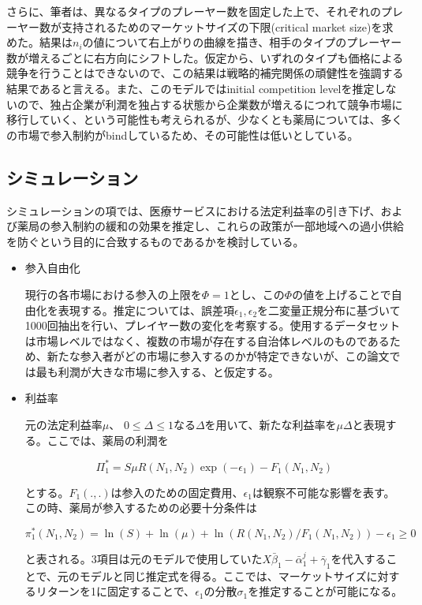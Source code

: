 \documentclass[11pt]{jsarticle}
\begin{document}
さらに、筆者は、異なるタイプのプレーヤー数を固定した上で、それぞれのプレーヤー数が支持されるためのマーケットサイズの下限(critical market size)を求めた。結果は$n_i$の値について右上がりの曲線を描き、相手のタイプのプレーヤー数が増えるごとに右方向にシフトした。仮定から、いずれのタイプも価格による競争を行うことはできないので、この結果は戦略的補完関係の頑健性を強調する結果であると言える。また、このモデルではinitial competition levelを推定しないので、独占企業が利潤を独占する状態から企業数が増えるにつれて競争市場に移行していく、という可能性も考えられるが、少なくとも薬局については、多くの市場で参入制約がbindしているため、その可能性は低いとしている。

\subsection{シミュレーション}

シミュレーションの項では、医療サービスにおける法定利益率の引き下げ、および薬局の参入制約の緩和の効果を推定し、これらの政策が一部地域への過小供給を防ぐという目的に合致するものであるかを検討している。

\begin{itemize}
  \item 参入自由化

  現行の各市場における参入の上限を$\Phi = 1$とし、この$\Phi$の値を上げることで自由化を表現する。推定については、誤差項$\epsilon_1, \epsilon_2$を二変量正規分布に基づいて1000回抽出を行い、プレイヤー数の変化を考察する。使用するデータセットは市場レベルではなく、複数の市場が存在する自治体レベルのものであるため、新たな参入者がどの市場に参入するのかが特定できないが、この論文では最も利潤が大きな市場に参入する、と仮定する。

  \item 利益率

  元の法定利益率$\mu$、 $0 \leq \Delta \leq 1$なる$\Delta$を用いて、新たな利益率を$\mu \Delta$と表現する。ここでは、薬局の利潤を

  \[
  \Pi_1^* = S \mu R(N_1, N_2) \exp(-\epsilon_1) - F_1(N_1, N_2)
  \]

  とする。$F_1(.,.)$は参入のための固定費用、$\epsilon_1$は観察不可能な影響を表す。この時、薬局が参入するための必要十分条件は

  \[
  \pi_1^*(N_1, N_2) = \ln(S) + \ln(\mu) + \ln(R(N_1, N_2)/F_1(N_1, N_2))-\epsilon_1 \geq 0
  \]

  と表される。3項目は元のモデルで使用していた$X \bar{\beta}_1 - \bar{\alpha}_1^j + \bar{\gamma}_1$を代入することで、元のモデルと同じ推定式を得る。ここでは、マーケットサイズに対するリターンを1に固定することで、$\epsilon_1$の分散$\sigma_1$を推定することが可能になる。
\end{itemize}
\end{document}
